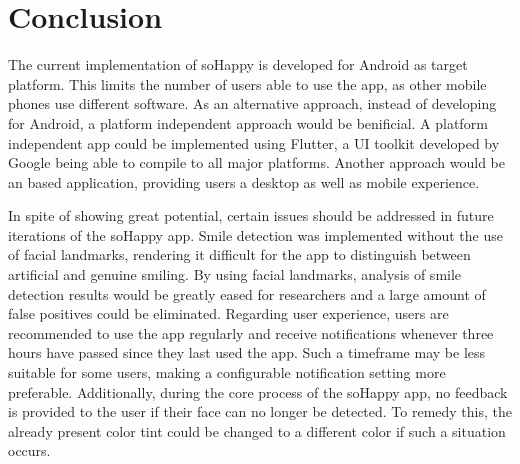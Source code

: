 \section{Conclusion} \label{sec:conclusion}

The current implementation of soHappy is developed for Android as target
platform. This limits the number of users able to use the app, as other 
mobile phones use different software. As an alternative approach, instead of
developing for Android, a platform independent approach would be benificial.
A platform independent app could be implemented using Flutter, a UI toolkit 
developed by Google being able to compile to all major platforms. Another
approach would be an based application, providing users a desktop as well as
mobile experience.

In spite of showing great potential, certain issues should be addressed in future
iterations of the soHappy app. Smile detection was implemented without the use of
facial landmarks, rendering it difficult for the app to distinguish between artificial
and genuine smiling. By using facial landmarks, analysis of smile detection results
would be greatly eased for researchers and a large amount of false positives
could be eliminated. Regarding user experience, users are recommended to use the app 
regularly and receive notifications whenever three hours have passed since they last
used the app. Such a timeframe may be less suitable for some users, making a
configurable notification setting more preferable. Additionally, during the core
process of the soHappy app, no feedback is provided to the user if their face can
no longer be detected. To remedy this, the already present color tint could be
changed to a different color if such a situation occurs.


